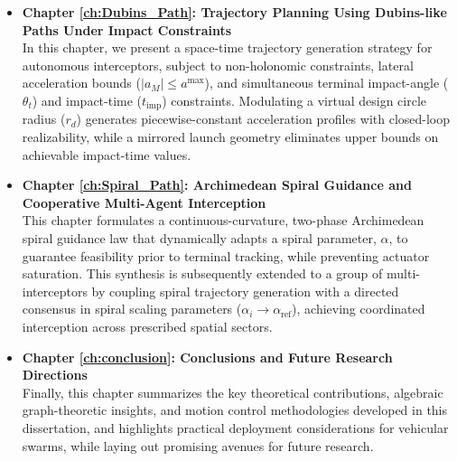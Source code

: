 \begin{itemize}
    \item \textbf{Chapter \ref{ch:Dubins_Path}: Trajectory Planning Using Dubins-like Paths Under Impact Constraints} \\
    In this chapter, we present a space-time trajectory generation strategy for autonomous interceptors, subject to non-holonomic constraints, lateral acceleration bounds ($|a_M| \le a^{\text{max}}$), and simultaneous terminal impact-angle ($\theta_t$) and impact-time ($t_{\text{imp}}$) constraints. Modulating a virtual design circle radius ($r_d$) generates piecewise-constant acceleration profiles with closed-loop realizability, while a mirrored launch geometry eliminates upper bounds on achievable impact-time values.
    
    \item \textbf{Chapter \ref{ch:Spiral_Path}: Archimedean Spiral Guidance and Cooperative Multi-Agent Interception} \\
    This chapter formulates a continuous-curvature, two-phase Archimedean spiral guidance law that dynamically adapts a spiral parameter, $\alpha$, to guarantee feasibility prior to terminal tracking, while preventing actuator saturation. This synthesis is subsequently extended to a group of multi-interceptors by coupling spiral trajectory generation with a directed consensus in spiral scaling parameters ($\alpha_i \to \alpha_{\text{ref}}$), achieving coordinated interception across prescribed spatial sectors.
    
    \item \textbf{Chapter \ref{ch:conclusion}: Conclusions and Future Research Directions} \\
    Finally, this chapter summarizes the key theoretical contributions, algebraic graph-theoretic insights, and motion control methodologies developed in this dissertation, and highlights practical deployment considerations for vehicular swarms, while laying out promising avenues for future research.
\end{itemize}
